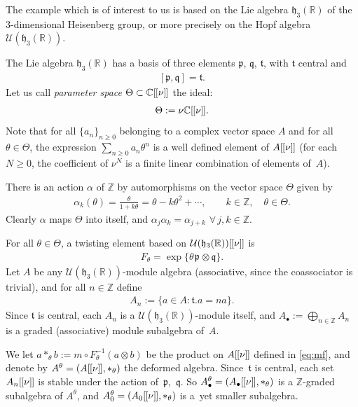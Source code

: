 \documentclass[pdftex]{sigma}
\numberwithin{equation}{section}
\theoremstyle{definition}
\newcommand{\U}{\mathcal{U}}
\newcommand{\R}{\mathbb{R}}
\newcommand{\C}{\mathbb{C}}
\newcommand{\Z}{\mathbb{Z}}
\newcommand{\mf}{\mathfrak}
\newcommand{\lbrak}{[\hspace{-0.5pt}[}
\newcommand{\rbrak}{]\hspace{-0.5pt}]}
\newcommand{\ga}{\mf{p}}
\newcommand{\gb}{\mf{q}}
\newcommand{\gc}{\mf{t}}
\renewcommand{\hbar}{\nu}
\begin{document}
The example which is of interest to us is based on the Lie algebra $\mf{h}_3(\R)$ of the $3$-dimensional Heisenberg group, or more precisely on the Hopf algebra
$\U(\mf{h}_3(\R))$.

The Lie algebra $\mf{h}_3(\R)$ has a basis of three elements $\ga$, $\gb$, $\gc$, with $\gc$ central and
\begin{gather}\label{eq:h3R}
[\ga,\gb]=\gc .
\end{gather}
Let us call \emph{parameter space}
$\Theta\subset\C\lbrak\hbar\rbrak$ the ideal:
\begin{gather*}
\Theta:=\hbar \C\lbrak\hbar\rbrak .
\end{gather*}
Note that for all $\{a_n\}_{n\geq 0}$ belonging to a complex vector space $A$ and for all $\theta\in\Theta$, the expression $\sum_{n\geq 0}a_n\theta^n$ is a well def\/ined element of $A\lbrak\hbar\rbrak$ (for each $N\geq 0$, the coef\/f\/icient of $\hbar^N$ is a f\/inite linear combination
of elements of~$A$).

There is an action $\alpha$ of $\Z$ by automorphisms on the vector space $\Theta$ given by{\samepage
\begin{gather}\label{eq:nact}
\alpha_k(\theta)=\frac{\theta}{1+k\theta}=
\theta-k\theta^2+\cdots
 ,\qquad k\in\Z,\quad \theta\in\Theta.
\end{gather}
Clearly $\alpha$ maps $\Theta$ into itself, and $\alpha_j\alpha_k=\alpha_{j+k}$ $\forall\, j,k\in\Z$.}

For all $\theta\in\Theta$, a twisting element based on $\U(\mf{h}_3(\R))\lbrak \hbar\rbrak$ is
\begin{gather*}
F_\theta=\exp\big\{\theta\hspace{1pt}\ga\hspace{1pt}\otimes\gb\big\} .
\end{gather*}
Let $A$ be any $\U(\mf{h}_3(\R))$-module algebra (associative, since the coassociator is trivial), and for all $n\in\Z$ def\/ine
\begin{gather}\label{eq:An}
A_n:=\big\{ a\in A\colon \gc.a=na \big\} .
\end{gather}
Since $\gc$ is central, each $A_n$ is a $\U(\mf{h}_3(\R))$-module itself, and $A_\bullet:=\bigoplus_{n\in\Z}A_n$ is a graded (associative) module subalgebra of~$A$.

We let $a\ast_\theta b:=m\circ F_\theta^{-1}(a\otimes b)$ be the product on $A\lbrak\hbar\rbrak$ def\/ined in \eqref{eq:mf}, and denote by $A^\theta=(A\lbrak\hbar\rbrak,\ast_\theta)$ the deformed algebra.
Since~$\gc$ is central, each set $A_n\lbrak\hbar\rbrak$ is stable under the action of~$\ga$,~$\gb$. So
$A^\theta_\bullet=(A_\bullet\lbrak\hbar\rbrak,\ast_\theta)$ is a $\Z$-graded subalgebra of $A^\theta$, and $A^\theta_0=(A_0\lbrak\hbar\rbrak,\ast_\theta)$ is a~yet smaller subalgebra.
\end{document}
